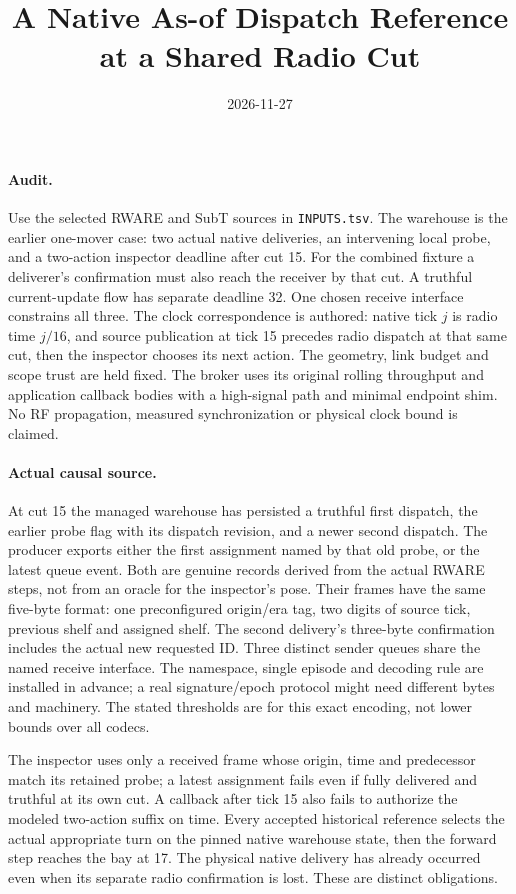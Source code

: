 \documentclass{article}
\title{A Native As-of Dispatch Reference at a Shared Radio Cut}
\date{2026-11-27}
\begin{document}
\maketitle

\paragraph{Audit.}
Use the selected RWARE and SubT sources in \texttt{INPUTS.tsv}.
The warehouse is the earlier one-mover case: two actual native
deliveries, an intervening local probe, and a two-action
inspector deadline after cut 15. For the combined fixture a
deliverer's confirmation must also reach the receiver by that cut.
A truthful current-update flow has separate deadline 32.
One chosen receive interface constrains all three.
The clock correspondence is authored: native tick \(j\)
is radio time \(j/16\), and source publication at tick 15
precedes radio dispatch at that same cut, then the inspector
chooses its next action. The geometry, link budget and scope
trust are held fixed. The broker uses its original rolling
throughput and application callback bodies with a high-signal
path and minimal endpoint shim. No RF propagation, measured
synchronization or physical clock bound is claimed.

\paragraph{Actual causal source.}
At cut 15 the managed warehouse has persisted a truthful first
dispatch, the earlier probe flag with its dispatch revision,
and a newer second dispatch. The producer exports either
the first assignment named by that old probe, or the latest
queue event. Both are genuine records derived from the
actual RWARE steps, not from an oracle for the inspector's
pose. Their frames have the same five-byte format: one
preconfigured origin/era tag, two digits of source tick,
previous shelf and assigned shelf. The second delivery's
three-byte confirmation includes the actual new requested
ID. Three distinct sender queues share the named receive
interface. The namespace, single episode and decoding rule
are installed in advance; a real signature/epoch protocol
might need different bytes and machinery. The stated thresholds
are for this exact encoding, not lower bounds over all codecs.

The inspector uses only a received frame whose origin,
time and predecessor match its retained probe; a latest
assignment fails even if fully delivered and truthful at
its own cut. A callback after tick 15 also fails to authorize
the modeled two-action suffix on time. Every accepted
historical reference selects the actual appropriate turn on
the pinned native warehouse state, then the forward step
reaches the bay at 17. The physical native delivery has
already occurred even when its separate radio confirmation
is lost. These are distinct obligations.
\end{document}
